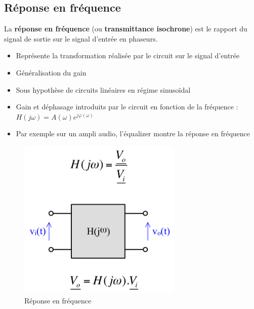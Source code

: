 \documentclass[a4paper]{article}
\begin{document}
    \subsection{Réponse en fréquence}
        La \textbf{réponse en fréquence} (ou \textbf{transmittance isochrone}) est le rapport du signal de sortie sur le signal d'entrée en phaseurs.
        \begin{itemize}
            \item Représente la transformation réalisée par le circuit sur le signal d'entrée
            \item Généralisation du gain
            \item Sous hypothèse de circuits linéaires en régime sinusoïdal
            \item Gain et déphasage introduits par le circuit en fonction de la fréquence : $ H(j\omega) = A(\omega)e^{j\varphi(\omega)} $
            \item Par exemple sur un ampli audio, l'équalizer montre la réponse en fréquence
        \end{itemize}
        \begin{figure}[H]
            \begin{center}
                \includegraphics[width=0.7\textwidth]{fig/2_reponse.png}
                \caption{Réponse en fréquence}
                \label{fig:2_superposition}
            \end{center}
        \end{figure}
\end{document}
